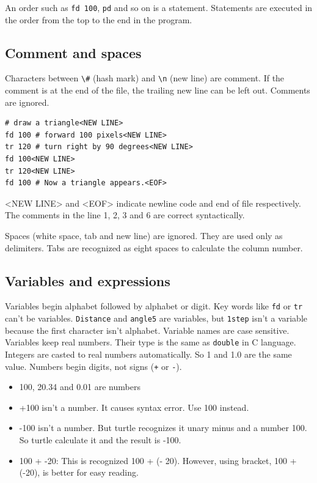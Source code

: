 An order such as \passthrough{\lstinline!fd 100!},
\passthrough{\lstinline!pd!} and so on is a statement. Statements are
executed in the order from the top to the end in the program.

\subsection{Comment and spaces}\label{comment-and-spaces}

Characters between \passthrough{\lstinline!\#!} (hash mark) and
\passthrough{\lstinline!\\n!} (new line) are comment. If the comment is
at the end of the file, the trailing new line can be left out. Comments
are ignored.

\begin{lstlisting}
# draw a triangle<NEW LINE>
fd 100 # forward 100 pixels<NEW LINE>
tr 120 # turn right by 90 degrees<NEW LINE>
fd 100<NEW LINE>
tr 120<NEW LINE>
fd 100 # Now a triangle appears.<EOF>
\end{lstlisting}

\textless NEW LINE\textgreater{} and \textless EOF\textgreater{}
indicate newline code and end of file respectively. The comments in the
line 1, 2, 3 and 6 are correct syntactically.

Spaces (white space, tab and new line) are ignored. They are used only
as delimiters. Tabs are recognized as eight spaces to calculate the
column number.

\subsection{Variables and expressions}\label{variables-and-expressions}

Variables begin alphabet followed by alphabet or digit. Key words like
\passthrough{\lstinline!fd!} or \passthrough{\lstinline!tr!} can't be
variables. \passthrough{\lstinline!Distance!} and
\passthrough{\lstinline!angle5!} are variables, but
\passthrough{\lstinline!1step!} isn't a variable because the first
character isn't alphabet. Variable names are case sensitive. Variables
keep real numbers. Their type is the same as
\passthrough{\lstinline!double!} in C language. Integers are casted to
real numbers automatically. So 1 and 1.0 are the same value. Numbers
begin digits, not signs (\passthrough{\lstinline!+!} or
\passthrough{\lstinline!-!}).

\begin{itemize}
\tightlist
\item
  100, 20.34 and 0.01 are numbers
\item
  +100 isn't a number. It causes syntax error. Use 100 instead.
\item
  -100 isn't a number. But turtle recognizes it unary minus and a number
  100. So turtle calculate it and the result is -100.
\item
  100 + -20: This is recognized 100 + (- 20). However, using bracket,
  100 + (-20), is better for easy reading.
\end{itemize}


